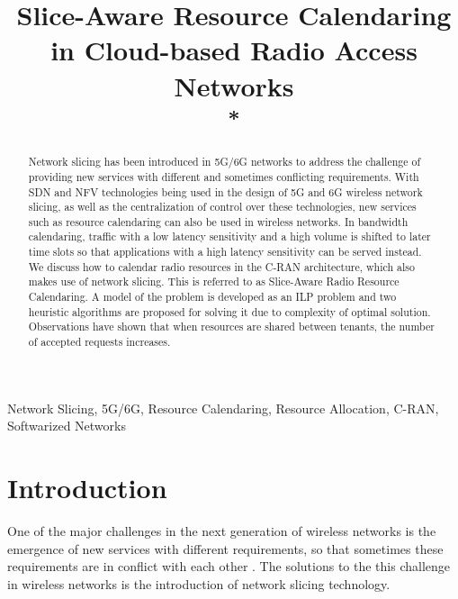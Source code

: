\documentclass[conference]{IEEEtran}
\begin{document}
\title{Slice-Aware Resource Calendaring in Cloud-based Radio Access Networks\\
{\footnotesize \textsuperscript{*}}
}

\author{
\and
{}
}

\maketitle

\begin{abstract}
Network slicing has been introduced in 5G/6G networks to address the challenge of providing new services with different and sometimes conflicting requirements. With SDN and NFV technologies being used in the design of 5G and 6G wireless network slicing, as well as the centralization of control over these technologies, new services such as resource calendaring can also be used in wireless networks. In bandwidth calendaring, traffic with a low latency sensitivity and a high volume is shifted to later time slots so that applications with a high latency sensitivity can be served instead. 
We discuss how to calendar radio resources in the C-RAN architecture, which also makes use of network slicing. This is referred to as Slice-Aware Radio Resource Calendaring. A model of the problem is developed as an ILP problem and two heuristic algorithms are proposed for solving it due to complexity of optimal solution. Observations have shown that when resources are shared between tenants, the number of accepted requests  increases.

\end{abstract}

\begin{IEEEkeywords}
Network Slicing, 5G/6G, Resource Calendaring, Resource Allocation, C-RAN, Softwarized Networks
\end{IEEEkeywords}

\section{Introduction}
One of the major challenges in the next generation of wireless networks is the emergence of new services with different requirements, so that sometimes these requirements are in conflict with each other \cite{vassilaras2017algorithmic}.
The solutions to the this challenge in wireless networks is the introduction of network slicing technology. 
\end{document}
